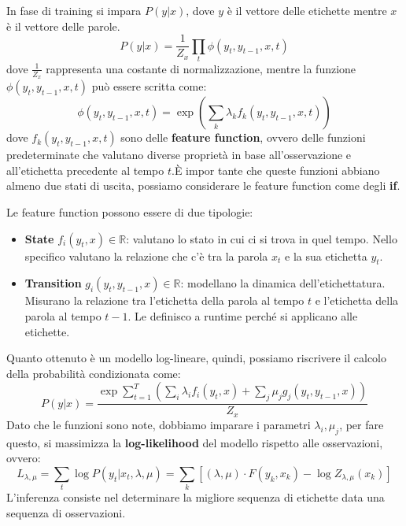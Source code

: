 In fase di training si impara $P(y|x)$, dove $y$ è il vettore delle etichette
mentre $x$ è il vettore delle parole.
\begin{equation}
      P(y|x) = \frac{1}{Z_x} \prod_t \phi(y_t,y_{t-1},x ,t)
\end{equation}
dove $\frac{1}{Z_x}$ rappresenta una costante di normalizzazione, mentre la
funzione $\phi(y_t,y_{t-1},x ,t)$ può essere scritta come:
\begin{equation}
      \phi(y_t,y_{t-1},x ,t) = \exp (\sum_k\lambda_k f_k(y_t,y_{t-1},x,t))
\end{equation}
dove $f_k(y_t,y_{t-1},x,t)$ sono delle \textbf{feature function}, ovvero delle
funzioni predeterminate che valutano diverse proprietà in base all'osservazione e
all'etichetta precedente al tempo $t$.È impor tante che queste funzioni abbiano
almeno due stati di uscita, possiamo considerare le feature function come degli
\textbf{if}.

Le feature function possono essere di due tipologie:
\begin{itemize}
      \item \textbf{State} $f_i(y_t, x) \in \mathbb{R}$: valutano lo stato in
            cui ci si trova in quel tempo. Nello specifico valutano la relazione
            che c'è tra la parola $x_t$ e la sua etichetta $y_t$.
      \item \textbf{Transition} $g_i(y_t, y_{t - 1}, x) \in \mathbb{R}$: modellano
            la dinamica dell'etichettatura. Misurano la relazione tra l'etichetta
            della parola al tempo $t$ e l'etichetta della parola al tempo $t - 1$.
            Le definisco a runtime perché si applicano alle etichette.
\end{itemize}

Quanto ottenuto è un modello log-lineare, quindi, possiamo riscrivere il calcolo
della probabilità condizionata come:
\begin{equation}
      P(y|x) = \frac{\exp \sum_{t = 1}^T\left( \sum_i \lambda_i f_i(y_t,x) +
      \sum_j \mu_j g_j(y_t,y_{t-1},x) \right)}{Z_x}
\end{equation}
Dato che le funzioni sono note, dobbiamo imparare i parametri $\lambda_i, \mu_j$,
per fare questo, si massimizza la \textbf{log-likelihood} del modello rispetto
alle osservazioni, ovvero:
\begin{equation}
      L_{\lambda,\mu} = \sum_{t} \log P(y_t|x_t, \lambda, \mu) = \sum_k \left[
            (\lambda, \mu) \cdot F(y_k, x_k) - \log Z_{\lambda, \mu}(x_k) \right]
\end{equation}
L'inferenza consiste nel determinare la migliore sequenza di etichette data una
sequenza di osservazioni.

